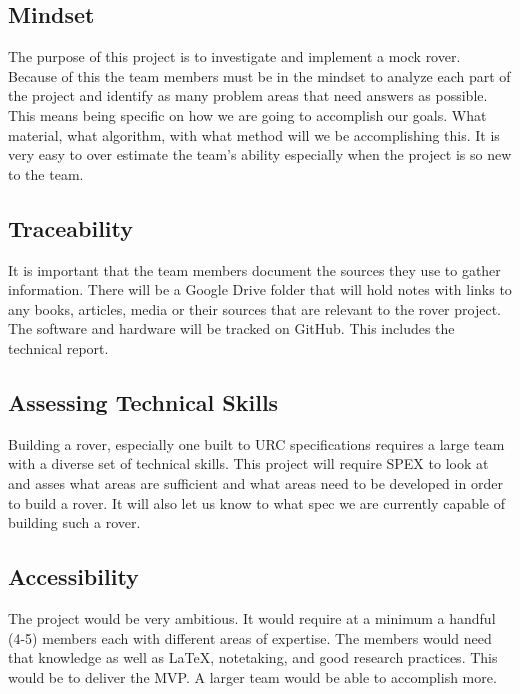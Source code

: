 \documentclass[conference]{IEEEtran} %
\begin{document}

\subsection{Mindset}
\label{subsec:mindset}
The purpose of this project is to investigate and implement a mock rover.
Because of this the team members must be in the mindset to analyze each part of the project and identify as many problem areas that need answers as possible. 
This means being specific on how we are going to accomplish our goals. 
What material, what algorithm, with what method will we be accomplishing this.
It is very easy to over estimate the team's ability especially when the project is so new to the team.

\subsection{Traceability}
\label{subsec:traceability}

It is important that the team members document the sources they use to gather information. 
There will be a Google Drive folder that will hold notes with links to any books, articles, media or their sources that are relevant to the rover project. 
The software and hardware will be tracked on GitHub. 
This includes the technical report.

\subsection{Assessing Technical Skills}
\label{subsec:assessing-technical-skills}

Building a rover, especially one built to URC specifications requires a large team with a diverse set of technical skills. 
This project will require SPEX to look at and asses what areas are sufficient and what areas need to be developed in order to build a rover. 
It will also let us know to what spec we are currently capable of building such a rover. 

\subsection{Accessibility}
\label{subsec:plug-n-play}

The project would be very ambitious. It would require at a minimum a handful (4-5) members each with different areas of expertise. 
The members would need that knowledge as well as \LaTeX{}, notetaking, and good research practices. 
This would be to deliver the MVP.
A larger team would be able to accomplish more.  
\end{document}

